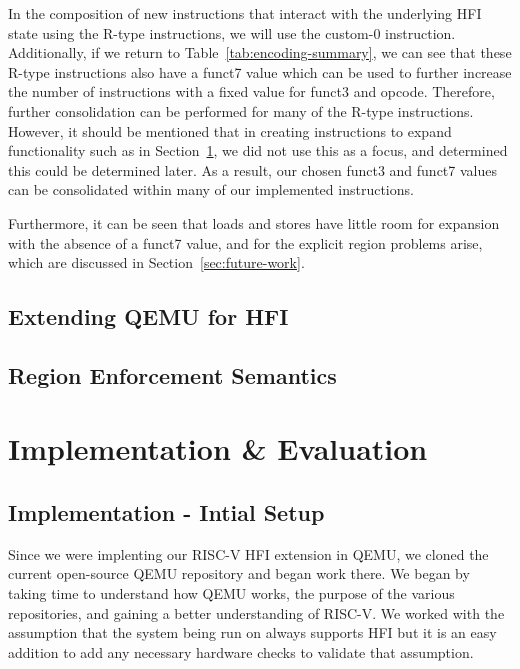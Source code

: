 \documentclass[conference,compsoc]{IEEEtran}
\begin{document}
In the composition of new instructions that interact with the underlying HFI state using the R-type instructions, we will use the custom-0 instruction.
Additionally, if we return to Table~\ref{tab:encoding-summary}, we can see that these R-type instructions also have a funct7 value which can be used to further increase the number of instructions with a fixed value for funct3 and opcode. 
Therefore, further consolidation can be performed for many of the R-type instructions. 
However, it should be mentioned that in creating instructions to expand functionality such as in Section~\ref{sec:impl-eval}, we did not use this as a focus, and determined this could be determined later.
As a result, our chosen funct3 and funct7 values can be consolidated within many of our implemented instructions.

Furthermore, it can be seen that loads and stores have little room for expansion with the absence of a funct7 value, and for the explicit region problems arise, which are discussed in Section~\ref{sec:future-work}. 

\subsection{Extending QEMU for HFI}

\subsection{Region Enforcement Semantics}


\section{Implementation \& Evaluation}
\label{sec:impl-eval}

\subsection{Implementation - Intial Setup}
Since we were implenting our RISC-V HFI extension in QEMU, we cloned the current open-source QEMU repository and began work there. We began by taking time to understand how QEMU works, the purpose of the various repositories, and gaining a better understanding of RISC-V. We worked with the assumption that the system being run on always supports HFI but it is an easy addition to add any necessary hardware checks to validate that assumption.
\end{document}
